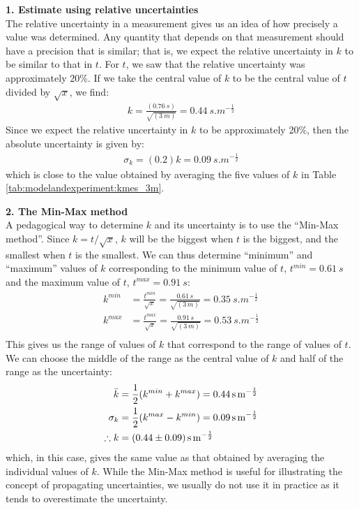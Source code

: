 \textbf{1. Estimate using relative uncertainties}\\
The relative uncertainty in a measurement gives us an idea of how precisely a value was determined. Any quantity that depends on that measurement should have a precision that is similar; that is, we expect the relative uncertainty in $k$ to be similar to that in $t$. For $t$, we saw that the relative uncertainty was approximately 20\%. If we take the central value of $k$ to be the central value of $t$ divided by $\sqrt x$, we find:
\begin{align*}
k=\frac{(\SI{0.76}{s})}{\sqrt{(\SI{3}{m})}}=\SI{0.44}{s.m^{-\frac{1}{2}}}
\end{align*} 
Since we expect the relative uncertainty in $k$ to be approximately 20\%, then the absolute uncertainty is given by:
\begin{align*}
\sigma_k = (0.2) k=\SI{0.09}{s.m^{-\frac{1}{2}}}
\end{align*}
which is close to the value obtained by averaging the five values of $k$ in Table \ref{tab:modelandexperiment:kmes_3m}.

\textbf{2. The Min-Max method}\\
A pedagogical way to determine $k$ and its uncertainty is to use the ``Min-Max method''. Since $k=t/\sqrt x$, $k$ will be the biggest when $t$ is the biggest, and the smallest when $t$ is the smallest. We can thus determine ``minimum'' and ``maximum'' values of $k$ corresponding to the minimum value of $t$, $t^{min}=\SI{0.61}{s}$ and the maximum value of $t$, $t^{max}=\SI{0.91}{s}$:
\begin{align*}
k^{min} &= \frac{t^{min}}{\sqrt x}=\frac{0.61\,s}{\sqrt{(3\,m)}} = \SI{0.35}{s.m^{-\frac{1}{2}}}\\
k^{max} &= \frac{t^{max}}{\sqrt x}=\frac{0.91\,s}{\sqrt{(3\,m)}} = \SI{0.53}{s.m^{-\frac{1}{2}}}\\
\end{align*}
This gives us the range of values of $k$ that correspond to the range of values of $t$. We can choose the middle of the range as the central value of $k$ and half of the range as the uncertainty:
\begin{align*}
\bar k &= \frac{1}{2}(k^{min}+k^{max})= \SI{0.44}{s.m^{-\frac{1}{2}}}\\
\sigma_k &= \frac{1}{2}(k^{max}-k^{min})= \SI{0.09}{s.m^{-\frac{1}{2}}}\\
\therefore k&= \SI{0.44 \pm 0.09}{s.m^{-\frac{1}{2}}}
\end{align*}
which, in this case, gives the same value as that obtained by averaging the individual values of $k$. While the Min-Max method is useful for illustrating the concept of propagating uncertainties, we usually do not use it in practice as it tends to overestimate the uncertainty. 

